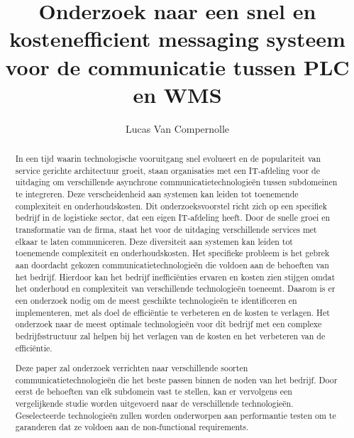 \documentclass{hogent-article}
\title{Onderzoek naar een snel en kostenefficient messaging systeem voor de communicatie tussen PLC en WMS}
\author{Lucas Van Compernolle}
\begin{document}
\begin{abstract}


In een tijd waarin technologische vooruitgang snel evolueert en de populariteit van service gerichte architectuur groeit,
staan organisaties met een IT-afdeling voor de uitdaging om verschillende asynchrone communicatietechnologieën tussen subdomeinen te integreren. 
Deze verscheidenheid aan systemen kan leiden tot toenemende complexiteit en onderhoudskosten.
Dit onderzoeksvoorstel richt zich op een specifiek bedrijf in de logistieke sector, dat een eigen IT-afdeling heeft.
Door de snelle groei en transformatie van de firma, staat het voor de uitdaging verschillende services met elkaar te laten communiceren. 
Deze diversiteit aan systemen kan leiden tot toenemende complexiteit en onderhoudskosten.
Het specifieke probleem is het gebrek aan doordacht gekozen communicatietechnologieën die voldoen aan de behoeften van het bedrijf.
Hierdoor kan het bedrijf inefficiënties ervaren en kosten zien stijgen omdat het onderhoud en complexiteit van 
verschillende technologieën toeneemt.
Daarom is er een onderzoek nodig om de meest geschikte technologieën te identificeren en implementeren, 
met als doel de efficiëntie te verbeteren en de kosten te verlagen.\linebreak
Het onderzoek naar de meest optimale technologieën voor dit bedrijf met een complexe 
bedrijfsstructuur zal helpen bij het verlagen van de kosten en het verbeteren van de efficiëntie. 
\newline

Deze paper zal onderzoek verrichten naar verschillende soorten communicatietechnologieën die 
het beste passen binnen de noden van het bedrijf.
Door eerst de behoeften van elk subdomein vast te stellen, kan er vervolgens een vergelijkende studie worden
uitgevoerd naar de verschillende technologieën. Geselecteerde technologieën zullen worden onderworpen aan performantie testen 
om te garanderen dat ze voldoen aan de non-functional requirements.
\newline
\end{abstract}

\tableofcontents



\printbibliography[heading=bibintoc]
\end{document}
